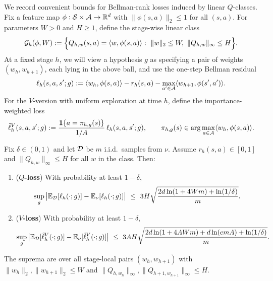 We record convenient bounds for Bellman-rank losses induced by linear $Q$-classes.
Fix a feature map $\phi:\mathcal{S}\times\mathcal{A}\to\mathbb{R}^d$ with $\|\phi(s,a)\|_2\le 1$ for all $(s,a)$.
For parameters $W>0$ and $H\ge 1$, define the stage-wise linear class
\[
\Gcal_h(\phi,W)
:=
\Big\{Q_{h,w}(s,a)=\langle w,\phi(s,a)\rangle:\ \|w\|_2\le W,\ \|Q_{h,w}\|_\infty\le H\Big\}.
\]
At a fixed stage $h$, we will view a hypothesis $g$ as specifying a pair of weights $(w_h,w_{h+1})$,
each lying in the above ball, and use the one-step Bellman residual
\[
\ell_h(s,a,s';g)
:= \langle w_h,\phi(s,a)\rangle - r_h(s,a) - \max_{a'\in\mathcal{A}}\langle w_{h+1},\phi(s',a')\rangle.
\]
For the $V$-version with uniform exploration at time $h$, define the importance-weighted loss
\[
\tilde{\ell}_h^{V}(s,a,s';g)
:= \frac{\mathbf{1}\{a=\pi_{h,g}(s)\}}{1/A}\,\ell_h(s,a,s';g),
\qquad
\pi_{h,g}(s)\in\arg\max_{a\in\mathcal{A}}\langle w_h,\phi(s,a)\rangle .
\]

\begin{lemma}
\label{lem:br_epsgen_linear}
Fix $\delta\in(0,1)$ and let $\mathcal{D}$ be $m$ i.i.d.\ samples from $\nu$.
Assume $r_h(s,a)\in[0,1]$ and $\|Q_{h,w}\|_\infty\le H$ for all $w$ in the class. Then:
\begin{enumerate}
\item (\textbf{$Q$-loss}) With probability at least $1-\delta$,
\[
\sup_{g}\big|\mathbb{E}_{\mathcal{D}}[\ell_h(\cdot;g)]-\mathbb{E}_{\nu}[\ell_h(\cdot;g)]\big|
\ \le\
3H\sqrt{\frac{2d\ln(1+4Wm)+\ln(1/\delta)}{m}}.
\]
\item (\textbf{$V$-loss}) With probability at least $1-\delta$,
\[
\sup_{g}\big|\mathbb{E}_{\mathcal{D}}[\tilde{\ell}_h^{V}(\cdot;g)]-\mathbb{E}_{\nu}[\tilde{\ell}_h^{V}(\cdot;g)]\big|
\ \le\
3AH\sqrt{\frac{2d\ln(1+4AWm)+d\ln(e m A)+\ln(1/\delta)}{m}}.
\]
\end{enumerate}
The suprema are over all stage-local pairs $(w_h,w_{h+1})$ with $\|w_h\|_2,\|w_{h+1}\|_2\le W$ and
$\|Q_{h,w_h}\|_\infty,\|Q_{h+1,w_{h+1}}\|_\infty\le H$.
\end{lemma}

